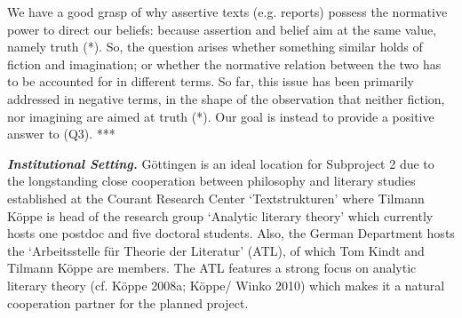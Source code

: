 \noindent We have a good grasp of why assertive texts (e.g. reports) possess the normative power to direct our beliefs: because assertion and belief aim at the same value, namely truth (*). So, the question arises whether something similar holds of fiction and imagination; or whether the normative relation between the two has to be accounted for in different terms. So far, this issue has been primarily addressed in negative terms, in the shape of the observation that neither fiction, nor imagining are aimed at truth (*). Our goal is instead to provide a positive answer to (Q3). ***



\vspace{.2cm}
\noindent\textbf{\emph{Institutional Setting.}} G\"ottingen is an ideal location for Subproject 2 due to the longstanding close cooperation between philosophy and literary studies established at the Courant Research Center `Textstrukturen' where Tilmann K\"oppe is head of the research group `Analytic literary theory' which currently hosts one postdoc and five doctoral students. Also, the German Department hosts the `Arbeitsstelle f\"ur Theorie der Literatur' (ATL), of which Tom Kindt and Tilmann K\"oppe are members. The ATL features a strong focus on analytic literary theory (cf. K\"oppe 2008a; K\"oppe/ Winko 2010) which makes it a natural cooperation partner for the planned project.